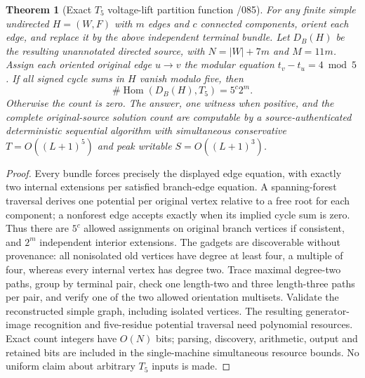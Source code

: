 \documentclass[11pt]{article}
\newtheorem{theorem}{Theorem}
\begin{document}
\begin{theorem}[Exact $T_5$ voltage-lift partition function /085]
For any finite simple undirected $H=(W,F)$ with $m$ edges and
$c$ connected components, orient each edge, and replace it by
the above independent terminal bundle. Let $D_B(H)$ be the
resulting \emph{unannotated} directed source, with
$N=|W|+7m$ and $M=11m$. Assign each oriented original edge
$u\to v$ the modular equation $t_v-t_u=4\bmod5$.
If all signed cycle sums in $H$ vanish modulo five, then
\[
 \boxed{\#\operatorname{Hom}(D_B(H),T_5)=5^c2^m.}
\]
Otherwise the count is zero. The answer, one witness when
positive, and the complete original-source solution count
are computable by a source-authenticated deterministic
sequential algorithm with simultaneous conservative
$T=O((L+1)^5)$ and peak writable
$S=O((L+1)^3)$.
\end{theorem}
\begin{proof}
Every bundle forces precisely the displayed edge equation,
with exactly two internal extensions per satisfied branch-edge
equation. A spanning-forest traversal derives one potential
per original vertex relative to a free root for each component;
a nonforest edge accepts exactly when its implied cycle sum is
zero. Thus there are $5^c$ allowed assignments on original
branch vertices if consistent, and $2^m$ independent interior
extensions. The gadgets are discoverable without provenance:
all nonisolated old vertices have degree at least four, a
multiple of four, whereas every internal vertex has degree two.
Trace maximal degree-two paths, group by terminal pair,
check one length-two and three length-three paths per pair,
and verify one of the two allowed orientation multisets.
Validate the reconstructed simple graph, including isolated
vertices. The resulting generator-image recognition and
five-residue potential traversal need polynomial resources.
Exact count integers have $O(N)$ bits; parsing, discovery,
arithmetic, output and retained bits are included in the
single-machine simultaneous resource bounds. No uniform
claim about arbitrary $T_5$ inputs is made.
\end{proof}
\end{document}
